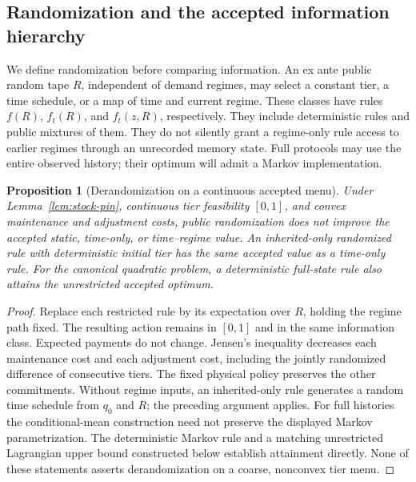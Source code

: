 \documentclass[11pt,letterpaper]{article}
\newtheorem{proposition}[theorem]{Proposition}
\theoremstyle{definition}
\newcommand{\1}{\mathbf 1}
\begin{document}
\subsection{Randomization and the accepted information hierarchy}
We define randomization before comparing information. An ex ante public random tape $R$, independent of demand regimes, may select a constant tier, a time schedule, or a map of time and current regime. These classes have rules $f(R)$, $f_t(R)$, and $f_t(z,R)$, respectively. They include deterministic rules and public mixtures of them. They do not silently grant a regime-only rule access to earlier regimes through an unrecorded memory state. Full protocols may use the entire observed history; their optimum will admit a Markov implementation.

\begin{proposition}[Derandomization on a continuous accepted menu]\label{prop:accepted-jensen}
Under Lemma~\ref{lem:stock-pin}, continuous tier feasibility $[0,1]$, and convex maintenance and adjustment costs, public randomization does not improve the accepted static, time-only, or time--regime value. An inherited-only randomized rule with deterministic initial tier has the same accepted value as a time-only rule. For the canonical quadratic problem, a deterministic full-state rule also attains the unrestricted accepted optimum.
\end{proposition}
\begin{proof}
Replace each restricted rule by its expectation over $R$, holding the regime path fixed. The resulting action remains in $[0,1]$ and in the same information class. Expected payments do not change. Jensen's inequality decreases each maintenance cost and each adjustment cost, including the jointly randomized difference of consecutive tiers. The fixed physical policy preserves the other commitments. Without regime inputs, an inherited-only rule generates a random time schedule from $q_0$ and $R$; the preceding argument applies. For full histories the conditional-mean construction need not preserve the displayed Markov parametrization. The deterministic Markov rule and a matching unrestricted Lagrangian upper bound constructed below establish attainment directly. None of these statements asserts derandomization on a coarse, nonconvex tier menu.
\end{proof}
\end{document}

